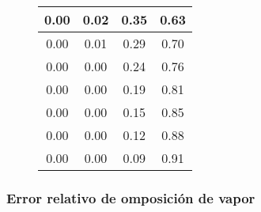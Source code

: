 \begin{figure}[H]
\begin{tabular}{|c|c|c|c|}
        0.00           & 0.02             & 0.35              & 0.63               \\
        \hline
        0.00           & 0.01             & 0.29              & 0.70               \\
        \hline
        0.00           & 0.00             & 0.24              & 0.76               \\
        \hline
        0.00           & 0.00             & 0.19              & 0.81               \\
        \hline
        0.00           & 0.00             & 0.15              & 0.85               \\
        \hline
        0.00           & 0.00             & 0.12              & 0.88               \\
        \hline
        0.00           & 0.00             & 0.09              & 0.91               \\
        \hline
    \end{tabular}
    \normalsize
\end{figure}

\newpage

\subsubsection{Error relativo de omposición de vapor}

